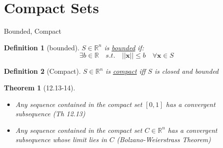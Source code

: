 \documentclass[a4paper,11pt]{article}
\newtheorem{defn}{Definition}
\newtheorem{thm}{Theorem}
\begin{document}
\section{Compact Sets} %
\label{sec:compact_sets}
\begin{frame}[t]{Bounded, Compact}
	\begin{defn}
		[bounded] $S\in\mathbb{R}^n$ is \uline{bounded} if:\[
			\exists b\in \mathbb{R}\quad s.t.\quad ||\mathbf{x}||\le b\quad \forall \mathbf{x}\in S
		\]
	\end{defn}
	\begin{defn}
		[Compact] $S\in\mathbb{R}^n $ is \uline{compact} iff $S$ is closed and bounded
	\end{defn}
	\begin{thm}[12.13-14]
		\begin{itemize}
			\item Any sequence contained in the compact set $[0,1]$ has a convergent subsequence (Th 12.13)
			\item Any sequence contained in the compact set $C\in\mathbb{R}^n$ has a convergent subsequence whose limit lies in $C$ (Bolzano-Weierstrass Theorem)
		\end{itemize}
	\end{thm}
\end{frame}
\end{document}
